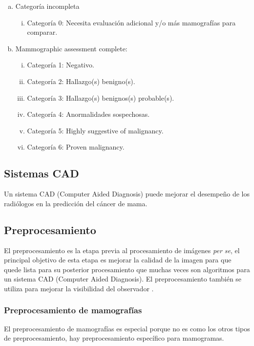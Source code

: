 \begin{enumerate}[a)]
    \item Categoría incompleta
    \begin{enumerate}[i.]
        \item Categoría 0: Necesita evaluación adicional y/o más mamografías para comparar.
    \end{enumerate}
    \item Mammographic assessment complete:
    \begin{enumerate}[i.]
        \item Categoría 1: Negativo.
        \item Categoría 2: Hallazgo(s) benigno(s).
        \item Categoría 3: Hallazgo(s) benignos(s) probable(s).
        \item Categoría 4: Anormalidades sospechosas.
        \item Categoría 5: Highly suggestive of malignancy.         
        \item Categoría 6: Proven malignancy.
    \end{enumerate}
\end{enumerate}

\subsection{Sistemas CAD}

Un sistema CAD (Computer Aided Diagnosis) puede mejorar el desempeño de los
radiólogos en la predicción del cáncer de mama.

\subsection{Preprocesamiento}
El preprocesamiento es la etapa previa al procesamiento de imágenes \textit{per
se}, el principal objetivo de esta etapa es mejorar la calidad de la imagen
para que quede lista para su posterior procesamiento \cite{ponraj2011survey}
que muchas veces son algoritmos para un sistema CAD (Computer Aided Diagnosis).
El preprocesamiento también se utiliza para mejorar la visibilidad del
observador \cite{rahmati2010new}. 

\subsubsection{Preprocesamiento de mamografías}
El preprocesamiento de mamografías es especial porque no es como los otros tipos
de preprocesamiento, hay preprocesamiento específico para mamogramas.

